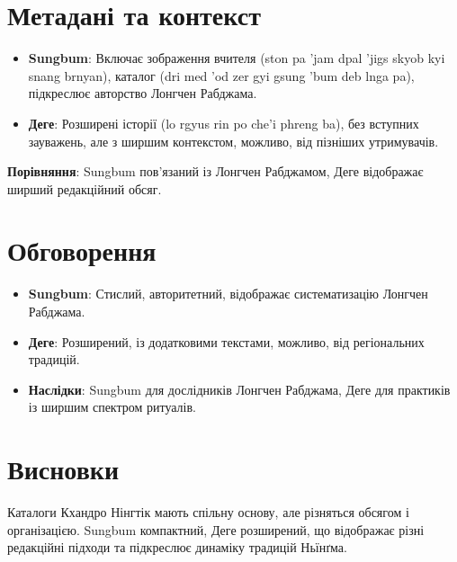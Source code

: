 \documentclass{article}
\begin{document}
\section{Метадані та контекст}
\begin{itemize}
    \item \textbf{Sungbum}: Включає зображення вчителя (ston pa 'jam dpal 'jigs skyob kyi snang brnyan), каталог (dri med 'od zer gyi gsung 'bum deb lnga pa), підкреслює авторство Лонгчен Рабджама.
    \item \textbf{Деге}: Розширені історії (lo rgyus rin po che'i phreng ba), без вступних зауважень, але з ширшим контекстом, можливо, від пізніших утримувачів.
\end{itemize}

\textbf{Порівняння}: Sungbum пов’язаний із Лонгчен Рабджамом, Деге відображає ширший редакційний обсяг.

\section{Обговорення}
\begin{itemize}
    \item \textbf{Sungbum}: Стислий, авторитетний, відображає систематизацію Лонгчен Рабджама.
    \item \textbf{Деге}: Розширений, із додатковими текстами, можливо, від регіональних традицій.
    \item \textbf{Наслідки}: Sungbum для дослідників Лонгчен Рабджама, Деге для практиків із ширшим спектром ритуалів.
\end{itemize}

\section{Висновки}
Каталоги Кхандро Нінгтік мають спільну основу, але різняться обсягом і організацією. Sungbum компактний, Деге розширений, що відображає різні редакційні підходи та підкреслює динаміку традицій Ньїнґма.
\end{document}
